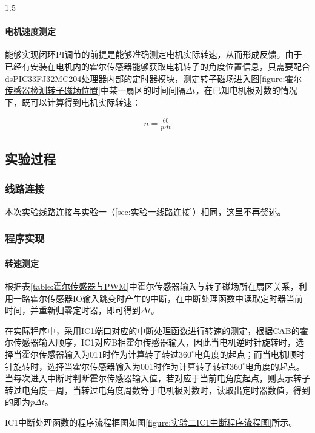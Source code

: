 \documentclass[a4paper,11pt]{ctexart}
\newcommand{\dsp}{dsPIC33FJ32MC204}
\newcommand{\du}[1]
{
	#1^{\circ}
}
\newenvironment{shrinkeq}[2]
{
	\bgroup
	\addtolength\abovedisplayshortskip{#1}
	\addtolength\abovedisplayskip{#1}
	\addtolength\belowdisplayshortskip{#2}
	\addtolength\belowdisplayskip{#2}
}
{
	\egroup
	\ignorespacesafterend
}
\begin{document}
\begin{spacing}{1.5}
\paragraph{电机速度测定}
能够实现闭环PI调节的前提是能够准确测定电机实际转速，从而形成反馈。由于已经有安装在电机内的霍尔传感器能够获取电机转子的角度位置信息，只需要配合\dsp 处理器内部的定时器模块，测定转子磁场进入图\ref{figure:霍尔传感器检测转子磁场位置}中某一扇区的时间间隔$\Delta t$，在已知电机极对数的情况下，既可以计算得到电机实际转速：
\begin{shrinkeq}{-1.5ex}{-2.5ex}
	\begin{align}
	n = \frac{60}{p\Delta t}
	\end{align}
\end{shrinkeq}
\subsection{实验过程}
\subsubsection{线路连接}
\par
本次实验线路连接与实验一（\ref{sec:实验一线路连接}）相同，这里不再赘述。
\subsubsection{程序实现}
\paragraph{转速测定}
根据表\ref{table:霍尔传感器与PWM}中霍尔传感器输入与转子磁场所在扇区关系，利用一路霍尔传感器IO输入跳变时产生的中断，在中断处理函数中读取定时器当前时间，并重新归零定时器，即可得到$\Delta t$。
\par
在实际程序中，采用IC1端口对应的中断处理函数进行转速的测定，根据CAB的霍尔传感器输入顺序，IC1对应B相霍尔传感器输入，因此当电机逆时针旋转时，选择当霍尔传感器输入为011时作为计算转子转过$\du{360}$电角度的起点；而当电机顺时针旋转时，选择当霍尔传感器输入为001时作为计算转子转过$\du{360}$电角度的起点。当每次进入中断时判断霍尔传感器输入值，若对应于当前电角度起点，则表示转子转过电角度一周，当转过电角度周数等于电机极对数时，读取出定时器数值，得到的即为$p\Delta t$。
\par
IC1中断处理函数的程序流程框图如图\ref{figure:实验二IC1中断程序流程图}所示。
\begin{figure}[h]
	\centering
\end{figure}
\end{spacing}
\end{document}
